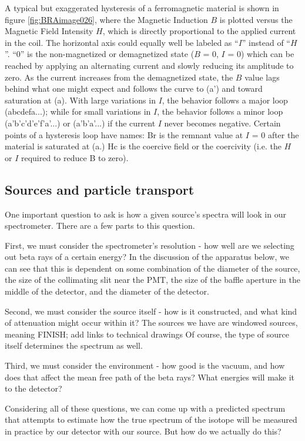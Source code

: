 \documentclass{../lab}
\begin{document}
A typical but exaggerated hysteresis of a ferromagnetic material is shown in figure \ref{fig:BRAimage026}, where the Magnetic Induction $B$ is plotted versus the Magnetic Field Intensity $H$, which is directly proportional to the applied current in the coil. The horizontal axis could equally well be labeled as ``$I$'' instead of ``$H$''. ``0'' is the non-magnetized or demagnetized state ($B$ = 0, $I$ = 0) which can be reached by applying an alternating current and slowly reducing its amplitude to zero. As the current increases from the demagnetized state, the $B$ value lags behind what one might expect and follows the curve to (a') and toward saturation at (a). With large variations in $I$, the behavior follows a major loop (abcdefa...); while for small variations in $I$, the behavior follows a minor loop (a'b'c'd'e'f'a'...) or (a'b'a'...) if the current $I$ never becomes negative. Certain points of a hysteresis loop have names: Br is the remnant value at $I$ = 0 after the material is saturated at (a.) Hc is the coercive field or the coercivity (i.e. the $H$ or $I$ required to reduce B to zero).

\subsection{Sources and particle transport}

One important question to ask is how a given source's spectra will look in our spectrometer. There are a few parts to this question. 

First, we must consider the spectrometer's resolution - how well are we selecting out beta rays of a certain energy? In the discussion of the apparatus below, we can see that this is dependent on some combination of the diameter of the source, the size of the collimating slit near the PMT, the size of the baffle aperture in the middle of the detector, and the diameter of the detector.

Second, we must consider the source itself - how is it constructed, and what kind of attenuation might occur within it? The sources we have are windowed sources, meaning FINISH; add links to technical drawings Of course, the type of source itself determines the spectrum as well.

Third, we must consider the environment - how good is the vacuum, and how does that affect the mean free path of the beta rays? What energies will make it to the detector?

Considering all of these questions, we can come up with a predicted spectrum that attempts to estimate how the true spectrum of the isotope will be measured in practice by our detector with our source. But how do we actually do this?
\end{document}
